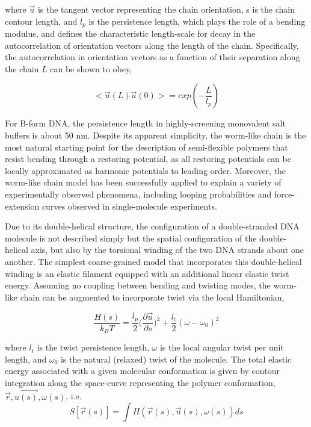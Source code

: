 \documentclass[english]{article}
\begin{document}
where  $\vec{u}$  is the tangent vector representing the chain orientation, s is the chain contour length, and $l_p$ is the persistence length, which plays the role of a bending modulus, and defines the characteristic length-scale for decay in the autocorrelation of orientation vectors along the length of the chain. Specifically, the autocorrelation in orientation vectors as a function of their separation along the chain $L$ can be shown to obey,

\begin{equation}
<\vec{u}(L)\dot{}\vec{u}(0)>=exp(-\frac{L}{l_p})
\end{equation}
 
For B-form DNA, the persistence length in highly-screening monovalent salt buffers is about 50 nm. Despite its apparent simplicity, the worm-like chain is the most natural starting point for the description of semi-flexible polymers that resist bending through a restoring potential, as all restoring potentials can be locally approximated as harmonic potentials to leading order. Moreover, the worm-like chain model has been successfully applied to explain a variety of experimentally observed phenomena, including looping probabilities and force-extension curves observed in single-molecule experiments.

Due to its double-helical structure, the configuration of a double-stranded DNA molecule is not described simply but the spatial configuration of the double-helical axis, but also by the torsional winding of the two DNA strands about one another. The simplest coarse-grained model that incorporates this double-helical winding is an elastic filament equipped with an additional linear elastic twist energy. Assuming no coupling between bending and twisting modes, the worm-like chain can be augmented to incorporate twist via the local Hamiltonian,

\begin{equation}
\frac{H(s)}{k_BT}=\frac{l_p}{2}\Big(\frac{\partial{\vec{u}}}{\partial{s}}\Big)^2+\frac{l_t}{2}(\omega-\omega_0)^2 \label{WLC-twist}
\end{equation}

where $l_t$ is the twist persistence length, $\omega$ is the local angular twist per unit length, and $\omega_0$ is the natural (relaxed) twist of the molecule. The total elastic energy associated with a given molecular conformation is given by contour integration along the space-curve representing the polymer conformation,  ${\vec{r},\vec{u(s)},\omega(s)}$, i.e.
\begin{equation}
S[\vec{r}(s)]=\int H(\vec{r}(s),\vec{u}(s),\omega(s))ds
\end{equation}
\end{document}
